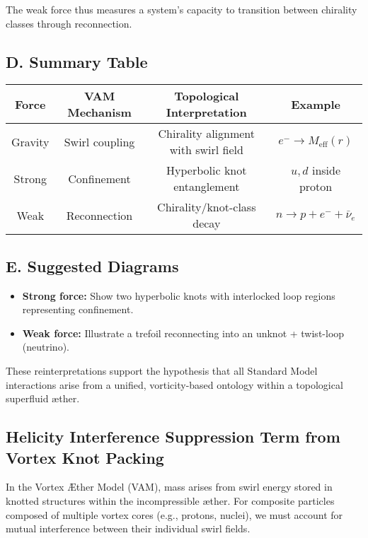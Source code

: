 \documentclass[12pt]{article}
\begin{document}
The weak force thus measures a system’s capacity to transition between chirality classes through reconnection.

\subsection*{D. Summary Table}

\begin{center}
\begin{tabular}{|c|c|c|c|}
\hline
\textbf{Force} & \textbf{VAM Mechanism} & \textbf{Topological Interpretation} & \textbf{Example} \\
\hline
Gravity & Swirl coupling & Chirality alignment with swirl field & \( e^- \rightarrow M_{\text{eff}}(r) \) \\
Strong & Confinement & Hyperbolic knot entanglement & \( u, d \) inside proton \\
Weak & Reconnection & Chirality/knot-class decay & \( n \rightarrow p + e^- + \bar{\nu}_e \) \\
\hline
\end{tabular}
\end{center}

\subsection*{E. Suggested Diagrams}

\begin{itemize}
    \item \textbf{Strong force:} Show two hyperbolic knots with interlocked loop regions representing confinement.
    \item \textbf{Weak force:} Illustrate a trefoil reconnecting into an unknot + twist-loop (neutrino).
\end{itemize}

\bigskip

These reinterpretations support the hypothesis that all Standard Model interactions arise from a unified, vorticity-based ontology within a topological superfluid æther.







  \subsection*{Helicity Interference Suppression Term from Vortex Knot Packing}

In the Vortex Æther Model (VAM), mass arises from swirl energy stored in knotted structures within the incompressible æther. For composite particles composed of multiple vortex cores (e.g., protons, nuclei), we must account for mutual interference between their individual swirl fields.
\end{document}

